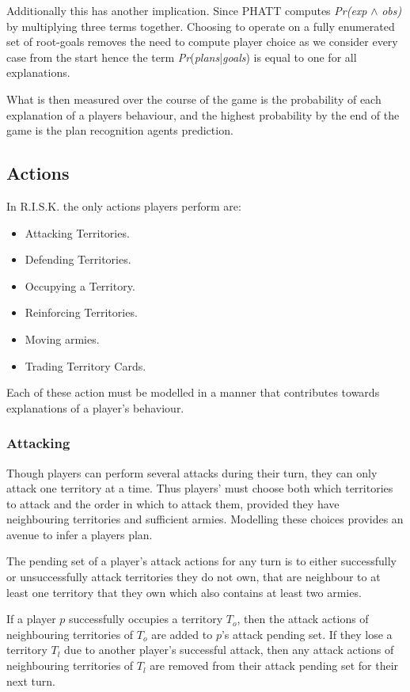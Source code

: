 \documentclass[parskip]{cs4rep}
\begin{document}
Additionally this has another implication. Since PHATT computes \textit{Pr(exp} $\wedge$ \textit{obs)} by multiplying three terms together. Choosing to operate on a fully enumerated set of root-goals removes the need to compute player choice as we consider every case from the start hence the term \textit{Pr}(\textit{plans}|\textit{goals}) is equal to one for all explanations.

What is then measured over the course of the game is the probability of each explanation of a players behaviour, and the highest probability by the end of the game is the plan recognition agents prediction.

\subsection{Actions}

In R.I.S.K. the only actions players perform are:

\begin{itemize}
\item
Attacking Territories.
\item
Defending Territories.
\item
Occupying a Territory.
\item
Reinforcing Territories.
\item
Moving armies.
\item
Trading Territory Cards.
\end{itemize}

Each of these action must be modelled in a manner that contributes towards explanations of a player's behaviour.

\subsubsection{Attacking}

Though players can perform several attacks during their turn, they can only attack one territory at a time. Thus players' must choose both which territories to attack and the order in which to attack them, provided they have neighbouring territories and sufficient armies. Modelling these choices provides an avenue to infer a players plan.

The pending set of a player's attack actions for any turn is to either successfully or unsuccessfully attack territories they do not own, that are neighbour to at least one territory that they own which also contains at least two armies.

If a player $p$ successfully occupies a territory $T_{o}$, then the attack actions of neighbouring territories of $T_{o}$ are added to $p$'s attack pending set. If they lose a territory $T_{l}$ due to another player's successful attack, then any attack actions of neighbouring territories of $T_{l}$ are removed from their attack pending set for their next turn. 
\end{document}
